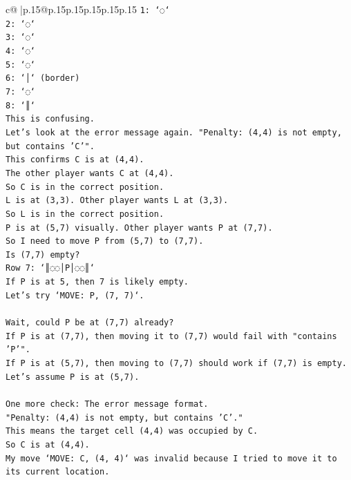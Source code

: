 \documentclass{article}
\begin{document}
{\begin{supertabular}{c@{$\;$}|p{.15\linewidth}@{}p{.15\linewidth}p{.15\linewidth}p{.15\linewidth}p{.15\linewidth}p{.15\linewidth}}
{{{\texttt{1: `◌`} \\
\texttt{2: `◌`} \\
\texttt{3: `◌`} \\
\texttt{4: `◌`} \\
\texttt{5: `◌`} \\
\texttt{6: `│` (border)} \\
\texttt{7: `◌`} \\
\texttt{8: `║`} \\
\texttt{This is confusing.} \\
\texttt{Let's look at the error message again. "Penalty: (4,4) is not empty, but contains 'C'".} \\
\texttt{This confirms C is at (4,4).} \\
\texttt{The other player wants C at (4,4).} \\
\texttt{So C is in the correct position.} \\
\texttt{L is at (3,3). Other player wants L at (3,3).} \\
\texttt{So L is in the correct position.} \\
\texttt{P is at (5,7) visually. Other player wants P at (7,7).} \\
\texttt{So I need to move P from (5,7) to (7,7).} \\
\texttt{Is (7,7) empty?} \\
\texttt{Row 7: `║◌◌│P│◌◌║`} \\
\texttt{If P is at 5, then 7 is likely empty.} \\
\texttt{Let's try `MOVE: P, (7, 7)`.} \\
\\ 
\texttt{Wait, could P be at (7,7) already?} \\
\texttt{If P is at (7,7), then moving it to (7,7) would fail with "contains 'P'".} \\
\texttt{If P is at (5,7), then moving to (7,7) should work if (7,7) is empty.} \\
\texttt{Let's assume P is at (5,7).} \\
\\ 
\texttt{One more check: The error message format.} \\
\texttt{"Penalty: (4,4) is not empty, but contains 'C'."} \\
\texttt{This means the target cell (4,4) was occupied by C.} \\
\texttt{So C is at (4,4).} \\
\texttt{My move `MOVE: C, (4, 4)` was invalid because I tried to move it to its current location.} \\
}}}
\end{supertabular}}
\end{document}
